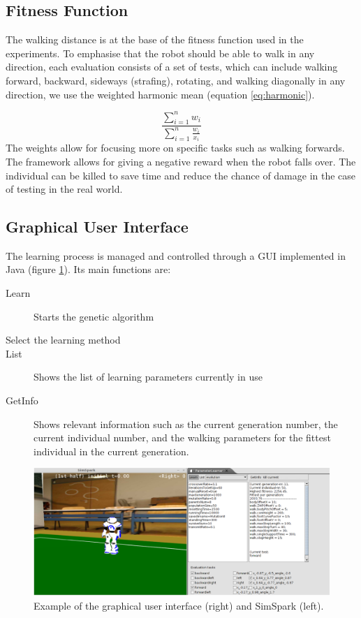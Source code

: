 \documentclass{article}
\begin{document}
\subsection{Fitness Function}

The walking distance is at the base of the fitness function used in the 
experiments. To emphasise that the robot should be able to walk in any 
direction, each evaluation consists of a set of tests, which can include
walking forward, backward, sideways (strafing), rotating, and walking
diagonally in any direction, we use the weighted harmonic mean (equation
\ref{eq:harmonic}).

\begin{equation}
	\frac{\sum^{n}_{i=1} w_i} {\sum^{n}_{i=1}\frac{w_i}{x_i}}
    \label{eq:harmonic}
\end{equation}
The weights allow for focusing more on specific tasks such as walking forwards.
The framework allows for giving a negative reward when the robot falls over.
The individual can be killed to save time and reduce the chance of damage in
the case of testing in the real world.
\subsection{Graphical User Interface}
The learning process is managed and controlled through a GUI implemented in Java (figure \ref{fig:gui}). 
Its main functions are:

\begin{description}
\item[Learn] Starts the genetic algorithm
\item[Select the learning method]
\item[List] Shows the list of learning parameters currently in use
\item[GetInfo] Shows relevant information such as the current generation number, the current individual number, and the walking parameters for the fittest individual in the current generation.
\end{description}


\begin{figure}[h!]
	\center
	\includegraphics[width=\textwidth]{images/GUI}
	\caption{Example of the graphical user interface (right) and SimSpark (left).}
	\label{fig:gui}
\end{figure}
\end{document}
